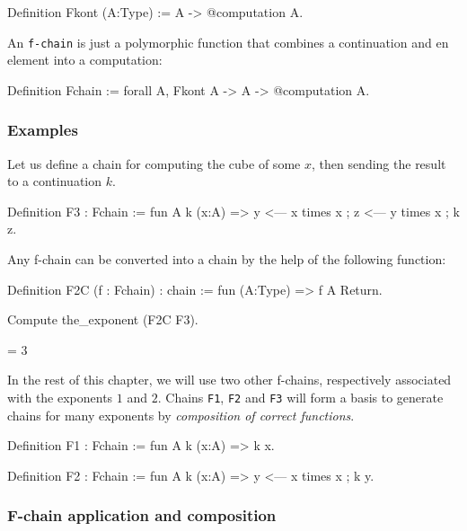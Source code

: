 \begin{Coqsrc}
Definition Fkont (A:Type) := A -> @computation A.
\end{Coqsrc}

An \texttt{f-chain} is just a polymorphic function that combines  a 
continuation and en element into a computation:

\begin{Coqsrc}
Definition Fchain := forall A, Fkont A -> A -> @computation A.
\end{Coqsrc}


\subsubsection{Examples}

Let us define a chain for computing the cube of some $x$, then sending 
the result to a continuation $k$.

\begin{Coqsrc}
Definition F3 : Fchain := 
 fun  A k  (x:A) =>
  y <--- x times x ;
  z <--- y times x ;
  k  z.
\end{Coqsrc}


Any f-chain can be converted into a chain by the help of the following function:

\begin{Coqsrc}
Definition F2C (f : Fchain) : chain :=
 fun (A:Type) => f A Return.

Compute the_exponent (F2C F3).
\end{Coqsrc}

\begin{Coqanswer}
= 3%
\end{Coqanswer}


In the rest of this chapter, we will use two other f-chains, respectively associated with the exponents $1$ and $2$. Chains \texttt{F1}, \texttt{F2} and
\texttt{F3} will form a basis to generate  chains for many exponents
by \emph{composition of correct functions}.

\begin{Coqsrc}
Definition F1 : Fchain := 
 fun A k (x:A) => k x.

Definition F2 : Fchain := 
fun  A k  (x:A) =>
  y <--- x times x ;
  k  y.
\end{Coqsrc}


\subsubsection{F-chain application and composition}

